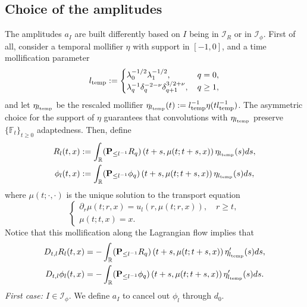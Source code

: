 \documentclass[10pt,a4paper]{amsart}
\numberwithin{equation}{section}
\numberwithin{corollario}{section}
\numberwithin{lemma}{section}
\numberwithin{prop}{section}
\theoremstyle{definition}
\theoremstyle{remark}
\newcommand{\R}{\mathbb{R}}
\renewcommand{\P}{\mathbf{P}}
\newcommand{\qq}{_{q+1}}
\begin{document}
\subsection{Choice of the amplitudes}
\label{ssec:amplitude}
The amplitudes $a_I$ are built differently based on $I$ being in $\mathcal{I}_R$ or in $\mathcal{I}_{\phi}$.
First of all, consider a temporal mollifier $\eta$ with support in $[-1,0]$, and a time mollification parameter 
\begin{equation}
l_{\rm temp}:=\begin{cases}
\lambda_0^{-1/2}\lambda_1^{-1/2},\,&q=0,\\
\lambda_q^{-1} \delta_q^{-2-\nu}\delta\qq^{3/2+\nu},\,&q\geq 1,
\end{cases}
\end{equation}
and let $\eta_{l_{\rm temp}}$ be the rescaled mollifier $\eta_{l_{\rm temp}}(t) := l^{-1}_{\rm temp} \eta( tl^{-1}_{\rm temp})$.
The asymmetric choice for the support of $\eta$ guarantees that convolutions with $\eta_{l_{\rm temp}}$ preserve $\{\mathbb{F}_t\}_{t \geq 0}$ adaptedness.
Then, define 
\begin{align}\label{e:Mollification}
    R_{l}(t,x)&:=\int_{\R}(\P_{\le l^{-1}}R_q)\left(t+s,\mu(t;t+s,x)\right)\eta_{l_{\rm temp}}(s)ds,\\
    \phi_{l}(t,x)&:=\int_{\R}(\P_{\le l^{-1}}\phi_q)\left(t+s,\mu(t;t+s,x)\right)\eta_{l_{\rm temp}}(s)ds,
\end{align}
where $\mu(t;\cdot,\cdot)$ is the unique solution to the transport equation 
\begin{equation}
\begin{cases}
    \partial_r \mu(t;r,x)=u_l(r,\mu(t;r,x)),
    \quad
    r \geq t,\\
    \mu(t;t,x)=x.
\end{cases}
\end{equation}
Notice that this mollification along the Lagrangian flow implies that
\begin{equation}\label{e:VantaggioMollFlux}
\begin{aligned}
        D_{t,l} R_{l}(t,x)&=-\int_{\R}(\P_{\le l^{-1}}R_q)\left(t+s,\mu(t;t+s,x)\right)\eta_{l_{\rm temp}}'(s)ds,\\
        D_{t,l} \phi_{l}(t,x)&=-\int_{\R}(\P_{\le l^{-1}}\phi_q)\left(t+s,\mu(t;t+s,x)\right)\eta_{l_{\rm temp}}'(s)ds.
\end{aligned}
\end{equation}
 {\emph{First case: $I \in \mathcal{I}_{\phi}$}}.
We define $a_I$ to cancel out $\phi_l$ through $d_0$. 
\end{document}
